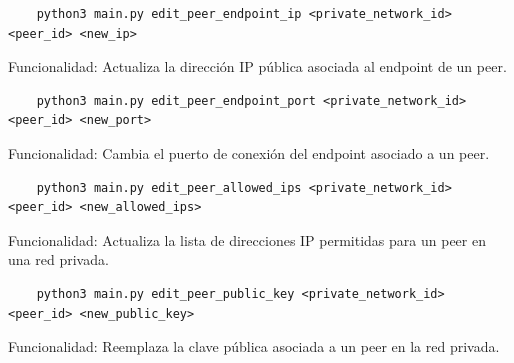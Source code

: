     \begin{verbatim}
    python3 main.py edit_peer_endpoint_ip <private_network_id> <peer_id> <new_ip>
    \end{verbatim}
    Funcionalidad:  
    Actualiza la dirección IP pública asociada al endpoint de un peer.
    
    \begin{verbatim}
    python3 main.py edit_peer_endpoint_port <private_network_id> <peer_id> <new_port>
    \end{verbatim}
    Funcionalidad:  
    Cambia el puerto de conexión del endpoint asociado a un peer.
    
    \begin{verbatim}
    python3 main.py edit_peer_allowed_ips <private_network_id> <peer_id> <new_allowed_ips>
    \end{verbatim}
    Funcionalidad:  
    Actualiza la lista de direcciones IP permitidas para un peer en una red privada.
    
    \begin{verbatim}
    python3 main.py edit_peer_public_key <private_network_id> <peer_id> <new_public_key>
    \end{verbatim}
    Funcionalidad:  
    Reemplaza la clave pública asociada a un peer en la red privada.
    